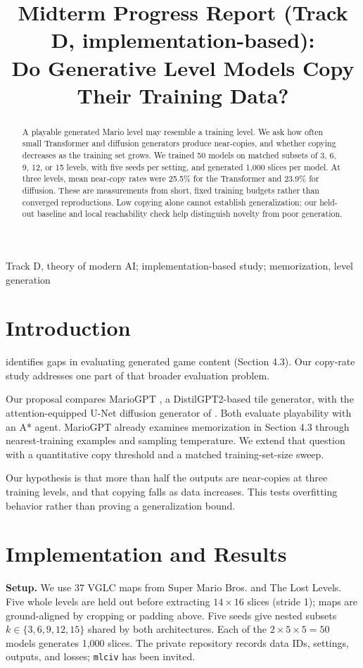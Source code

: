 \documentclass[11pt]{alt2027}
\title[Mario Level Memorization]{Midterm Progress Report (Track D, implementation-based):\\Do Generative Level Models Copy Their Training Data?}
\begin{document}
\maketitle
\begin{abstract}
A playable generated Mario level may resemble a training level. We ask how often small Transformer and diffusion generators produce near-copies, and whether copying decreases as the training set grows. We trained 50 models on matched subsets of 3, 6, 9, 12, or 15 levels, with five seeds per setting, and generated 1,000 slices per model. At three levels, mean near-copy rates were 25.5\% for the Transformer and 23.9\% for diffusion. These are measurements from short, fixed training budgets rather than converged reproductions. Low copying alone cannot establish generalization: our held-out baseline and local reachability check help distinguish novelty from poor generation.
\end{abstract}
\begin{keywords}Track D, theory of modern AI; implementation-based study; memorization, level generation\end{keywords}
\section{Introduction}
\citet{zhong} identifies gaps in evaluating generated game content (Section 4.3). Our copy-rate study addresses one part of that broader evaluation problem.

Our proposal compares MarioGPT \citep{mariogpt}, a DistilGPT2-based tile generator, with the attention-equipped U-Net diffusion generator of \citet{diffusion}. Both evaluate playability with an A* agent. MarioGPT already examines memorization in Section 4.3 through nearest-training examples and sampling temperature. We extend that question with a quantitative copy threshold and a matched training-set-size sweep.

Our hypothesis is that more than half the outputs are near-copies at three training levels, and that copying falls as data increases. This tests overfitting behavior rather than proving a generalization bound.

\section{Implementation and Results}
\textbf{Setup.} We use 37 VGLC maps from Super Mario Bros. and The Lost Levels. Five whole levels are held out before extracting $14\times16$ slices (stride 1); maps are ground-aligned by cropping or padding above. Five seeds give nested subsets $k\in\{3,6,9,12,15\}$ shared by both architectures. Each of the $2\times5\times5=50$ models generates 1,000 slices. The private repository records data IDs, settings, outputs, and losses; \texttt{mlciv} has been invited.
\end{document}
